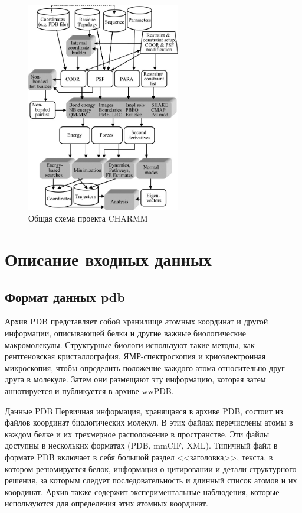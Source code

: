 \begin{figure}[h!]
\begin{center}
	\includegraphics[width=0.6\textwidth]{images/charmm.jpg}
	\caption{Общая схема проекта CHARMM}
    \label{charmm}
\end{center}
\end{figure}


\section{Описание входных данных}


\subsection{Формат данных pdb}

Архив PDB представляет собой хранилище атомных координат и другой информации, описывающей белки и другие важные биологические макромолекулы. Структурные биологи используют такие методы, как рентгеновская кристаллография, ЯМР-спектроскопия и криоэлектронная микроскопия, чтобы определить положение каждого атома относительно друг друга в молекуле. Затем они размещают эту информацию, которая затем аннотируется и публикуется в архиве wwPDB.

Данные PDB
Первичная информация, хранящаяся в архиве PDB, состоит из файлов координат биологических молекул. В этих файлах перечислены атомы в каждом белке и их трехмерное расположение в пространстве. Эти файлы доступны в нескольких форматах (PDB, mmCIF, XML). Типичный файл в формате PDB включает в себя большой раздел <<заголовка>>, текста, в котором резюмируется белок, информация о цитировании и детали структурного решения, за которым следует последовательность и длинный список атомов и их координат. Архив также содержит экспериментальные наблюдения, которые используются для определения этих атомных координат.

